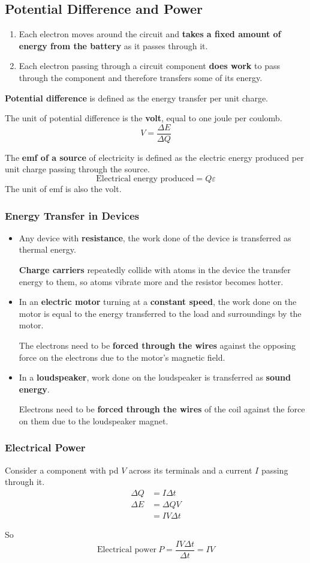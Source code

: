 \subsection{Potential Difference and Power}

\begin{enumerate}
    \item Each electron moves around the circuit and \textbf{takes a fixed amount of energy from the battery} as it passes through it.
    \item Each electron passing through a circuit component \textbf{does work} to pass through the component and therefore transfers some of its energy.
\end{enumerate}

\textbf{Potential difference} is defined as the energy transfer per unit charge.

The unit of potential difference is the \textbf{volt}, equal to one joule per coulomb.
$$V=\frac{\Delta E}{\Delta Q}$$

The \textbf{emf of a source} of electricity is defined as the electric energy produced per unit charge passing through the source.
$$\text{Electrical energy produced}=Q\varepsilon$$
The unit of emf is also the volt.

\subsubsection*{Energy Transfer in Devices}
\begin{itemize}
    \item Any device with \textbf{resistance}, the work done of the device is transferred as thermal energy.

        \textbf{Charge carriers} repeatedly collide with atoms in the device the transfer energy to them, so atoms vibrate more and the resistor becomes hotter.
    \item In an \textbf{electric motor} turning at a \textbf{constant speed}, the work done on the motor is equal to the energy transferred to the load and surroundings by the motor.

        The electrons need to be \textbf{forced through the wires} against the opposing force on the electrons due to the motor's magnetic field.
    \item In a \textbf{loudspeaker}, work done on the loudspeaker is transferred as \textbf{sound energy}.

        Electrons need to be \textbf{forced through the wires} of the coil against the force on them due to the loudspeaker magnet.
\end{itemize}

\subsubsection*{Electrical Power}

Consider a component with pd $V$ across its terminals and a current $I$ passing through it.
\begin{align*}
    \Delta Q&=I\Delta t\\
    \Delta E&=\Delta QV\\
     &=IV\Delta t
\end{align*}

So
$$\text{Electrical power}\ P=\frac{IV\Delta t}{\Delta t}=IV$$
